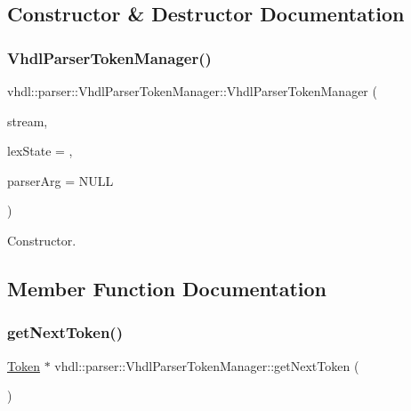 \subsection{Constructor \& Destructor Documentation}
\mbox{\label{classvhdl_1_1parser_1_1_vhdl_parser_token_manager_ae4dadde3df1ebd8e99399d60716633f9}} 
\subsubsection{\texorpdfstring{VhdlParserTokenManager()}{VhdlParserTokenManager()}}
{\footnotesize\ttfamily vhdl\+::parser\+::\+Vhdl\+Parser\+Token\+Manager\+::\+Vhdl\+Parser\+Token\+Manager (\begin{DoxyParamCaption}\item[{J\+A\+V\+A\+C\+C\+\_\+\+C\+H\+A\+R\+S\+T\+R\+E\+AM $\ast$}]{stream,  }\item[{int}]{lex\+State = {},  }\item[{\mbox{\hyperlink{classvhdl_1_1parser_1_1_vhdl_parser}{Vhdl\+Parser}} $\ast$}]{parser\+Arg = {\ttfamily NULL} }\end{DoxyParamCaption})}

Constructor. 

\subsection{Member Function Documentation}
\mbox{\label{classvhdl_1_1parser_1_1_vhdl_parser_token_manager_ac17f53300a62b7e188710e1c0bdbc1dc}} 
\subsubsection{\texorpdfstring{getNextToken()}{getNextToken()}}
{\footnotesize\ttfamily \mbox{\hyperlink{classvhdl_1_1parser_1_1_token}{Token}} $\ast$ vhdl\+::parser\+::\+Vhdl\+Parser\+Token\+Manager\+::get\+Next\+Token (\begin{DoxyParamCaption}{ }\end{DoxyParamCaption})\hspace{0.3cm}{\ttfamily [virtual]}}

